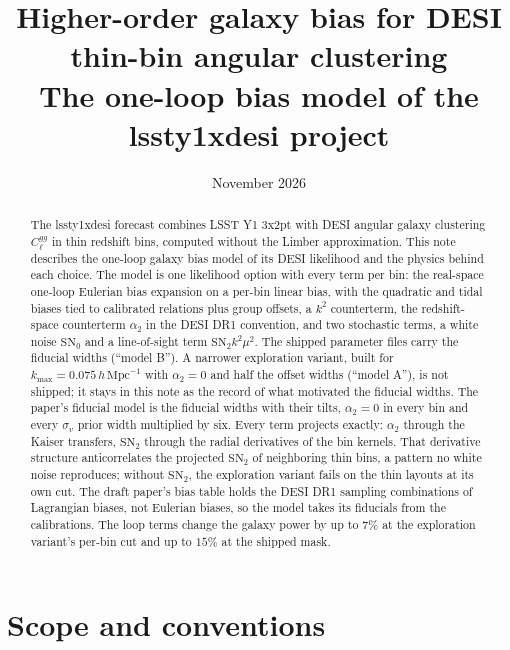 \documentclass[11pt]{article}
\title{Higher-order galaxy bias for DESI thin-bin angular clustering\\
\large The one-loop bias model of the lssty1xdesi project}
\date{November 2026}
\author{}
\newcommand{\kmax}{k_{\mathrm{max}}}
\newcommand{\hMpc}{\,h\,\mathrm{Mpc}^{-1}}
\newcommand{\SNz}{\mathrm{SN}_0}
\newcommand{\SNt}{\mathrm{SN}_2}
\begin{document}
\maketitle

\begin{abstract}
\noindent
The lssty1xdesi forecast combines LSST Y1 3x2pt with DESI angular
galaxy clustering $C_\ell^{gg}$ in thin redshift bins, computed without
the Limber approximation.  This note describes the one-loop galaxy bias
model of its DESI likelihood and the physics behind each choice.  The
model is one likelihood option with every term per bin: the real-space
one-loop Eulerian bias expansion on a per-bin linear bias, with the
quadratic and tidal biases tied to calibrated relations plus group
offsets, a $k^2$ counterterm, the redshift-space counterterm $\alpha_2$
in the DESI DR1 convention, and two stochastic terms, a white noise
$\SNz$ and a line-of-sight term $\SNt k^2\mu^2$.  The shipped
parameter files carry the fiducial widths (``model B'').  A narrower
exploration variant, built for $\kmax = 0.075\hMpc$ with
$\alpha_2 = 0$ and half the offset widths (``model A''), is not
shipped; it stays in this note as the record of what motivated the
fiducial widths.  The paper's fiducial model is the fiducial widths
with their tilts, $\alpha_2 = 0$ in every bin and every $\sigma_v$
prior width multiplied
by six.  Every term projects exactly: $\alpha_2$
through the Kaiser transfers, $\SNt$ through the radial derivatives of
the bin kernels.  That derivative structure anticorrelates the
projected $\SNt$ of neighboring thin bins, a pattern no white noise
reproduces; without $\SNt$, the exploration variant fails on the thin
layouts at its
own cut.  The draft paper's bias table holds the DESI DR1 sampling
combinations of Lagrangian biases, not Eulerian biases, so the model
takes its fiducials from the calibrations.  The loop terms change the
galaxy power by up to $7\%$ at the exploration variant's per-bin cut
and up to $15\%$
at the shipped mask.
\end{abstract}

\tableofcontents

\section{Scope and conventions}
\label{sec:scope}
\end{document}
